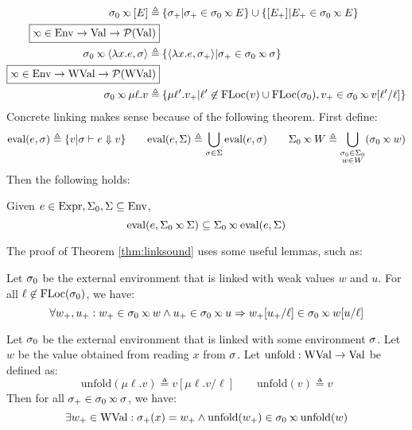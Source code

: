 \begin{align*}
  \ctx_0\semlink[E]\triangleq                            & \: \{\ctx_+|\ctx_+\in\ctx_0\semlink\event\}\cup\{[\event_+]|\event_+\in\ctx_0\semlink\event\}                                      \\
  \fbox{$\semlink\in\Ctx\rightarrow\Value\rightarrow\pset(\Value)$}                                                                                                                           \\
  \ctx_0\semlink\langle\lambda x.e,\ctx\rangle\triangleq & \: \{\langle\lambda x.e,\ctx_+\rangle|\ctx_+\in\ctx_0\semlink\ctx\}                                                                \\
  \fbox{$\semlink\in\Ctx\rightarrow\Walue\rightarrow\pset(\Walue)$}                                                                                                                           \\
  \ctx_0\semlink\mu\ell.v\triangleq                      & \: \{\mu\ell'.v_+|\ell'\not\in\FLoc(v)\cup\FLoc(\ctx_0), v_+\in\ctx_0\semlink v[\ell'/\ell]\}
\end{align*}
Concrete linking makes sense because of the following theorem.
First define:
\[\eval(e,\ctx)\triangleq\{v|\ctx\vdash e\Downarrow v\}\qquad\eval(e,\Sigma)\triangleq\bigcup_{\ctx\in\Sigma}\eval(e,\ctx)\qquad\Sigma_0\semlink W\triangleq\bigcup_{\substack{\ctx_0\in\Sigma_0\\w\in W}}(\ctx_0\semlink w)\]
Then the following holds:
\begin{thm}[Advance]\label{thm:linksound}
  Given $e\in\text{Expr},\Sigma_0,\Sigma\subseteq\text{Env}$,
  \[\eval(e,\Sigma_0\semlink\Sigma)\subseteq\Sigma_0\semlink\eval(e,\Sigma)\]
\end{thm}

The proof of Theorem \ref{thm:linksound} uses some useful lemmas, such as:
\begin{lem}
  Let $\sigma_0$ be the external environment that is linked with weak values $w$ and $u$.
  For all $\ell\not\in\text{FLoc}(\sigma_0)$, we have:
  \[\forall w_+,u_+:w_+\in\ctx_0\semlink w\wedge u_+\in\ctx_0\semlink u\Rightarrow w_+[u_+/\ell]\in\ctx_0\semlink w[u/\ell]\]
\end{lem}
\begin{lem}
  Let $\sigma_0$ be the external environment that is linked with some environment $\sigma$.
  Let $w$ be the value obtained from reading $x$ from $\sigma$.
  Let $\text{unfold}:\text{WVal}\rightarrow\text{Val}$ be defined as:
  \[\text{unfold}(\mu\ell.v)\triangleq v[\mu\ell.v/\ell]\qquad\text{unfold}(v)\triangleq v\]
  Then for all $\ctx_+\in\ctx_0\semlink\ctx$, we have:
  \[\exists w_+\in\Walue:\ctx_+(x)=w_+\land\text{unfold}(w_+)\in\ctx_0\semlink\text{unfold}(w)\]
\end{lem}


